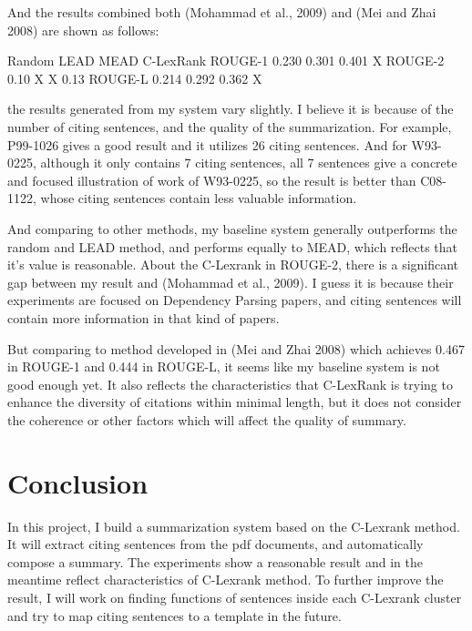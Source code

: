 \documentclass[hyp]{socreport}
\begin{document}
And the results combined both (Mohammad et al., 2009) and (Mei and
Zhai 2008) are shown as follows:

                    Random     LEAD     MEAD     C-LexRank
ROUGE-1            0.230      0.301      0.401        X
ROUGE-2            0.10          X       X           0.13
ROUGE-L            0.214      0.292      0.362        X


the results generated from my system vary slightly. I believe it is because of the number of citing sentences, and the 
quality of the summarization. For example, P99-1026 gives a good result and it utilizes 26 citing sentences. And for W93-0225, 
although it only contains 7 citing sentences, all 7 sentences give a concrete and focused illustration of work of W93-0225, 
so the result is better than C08-1122, whose citing sentences contain less valuable information. 

  And comparing to other methods, my baseline system generally outperforms the random and LEAD method, and performs equally 
to MEAD, which reflects that it's value is reasonable. About the C-Lexrank in ROUGE-2, there is a significant gap between 
my result and (Mohammad et al., 2009). I guess it is because their experiments are focused on Dependency Parsing papers, 
and citing sentences will contain more information in that kind of papers.  

    But comparing to method developed in (Mei and Zhai 2008) which achieves 0.467 in ROUGE-1 and 0.444 in ROUGE-L, it seems 
like my baseline system is not good enough yet. It also reflects the characteristics that C-LexRank is trying to enhance the 
diversity of citations within minimal length, but it does not consider the coherence or other factors which will affect the 
quality of summary. 

\section{Conclusion}

In this project, I build a summarization system based on the C-Lexrank method. It will extract citing sentences from the pdf 
documents, and automatically compose a summary. The experiments show a reasonable result and in the meantime reflect characteristics
 of C-Lexrank method. To further improve the result, I will work on finding functions of sentences inside each C-Lexrank cluster and 
try to map citing sentences to a template in the future.



\end{document}
